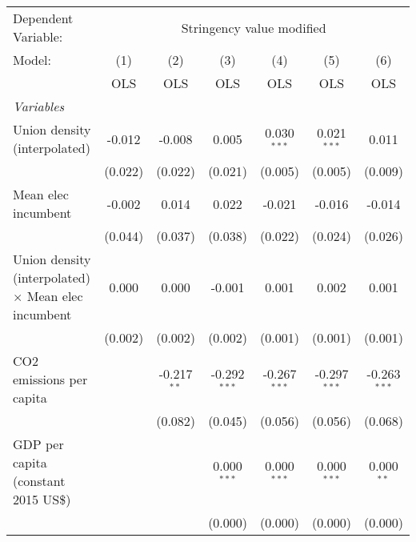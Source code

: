 
\begingroup
\centering
\begin{tabular}{lcccccc}
   \toprule
   Dependent Variable: & \multicolumn{6}{c}{Stringency value modified}\\
   Model:                                                     & (1)     & (2)           & (3)            & (4)            & (5)            & (6)\\  
                                                              &  OLS    & OLS           & OLS            & OLS            & OLS            & OLS\\  
   \midrule
   \emph{Variables}\\
   Union density (interpolated)                               & -0.012  & -0.008        & 0.005          & 0.030$^{***}$  & 0.021$^{***}$  & 0.011\\   
                                                              & (0.022) & (0.022)       & (0.021)        & (0.005)        & (0.005)        & (0.009)\\   
   Mean elec incumbent                                        & -0.002  & 0.014         & 0.022          & -0.021         & -0.016         & -0.014\\   
                                                              & (0.044) & (0.037)       & (0.038)        & (0.022)        & (0.024)        & (0.026)\\   
   Union density (interpolated) $\times$ Mean elec incumbent  & 0.000   & 0.000         & -0.001         & 0.001          & 0.002          & 0.001\\   
                                                              & (0.002) & (0.002)       & (0.002)        & (0.001)        & (0.001)        & (0.001)\\   
   CO2 emissions per capita                                   &         & -0.217$^{**}$ & -0.292$^{***}$ & -0.267$^{***}$ & -0.297$^{***}$ & -0.263$^{***}$\\   
                                                              &         & (0.082)       & (0.045)        & (0.056)        & (0.056)        & (0.068)\\   
   GDP per capita (constant 2015 US\$)                        &         &               & 0.000$^{***}$  & 0.000$^{***}$  & 0.000$^{***}$  & 0.000$^{**}$\\   
                                                              &         &               & (0.000)        & (0.000)        & (0.000)        & (0.000)\\   

\end{tabular}
